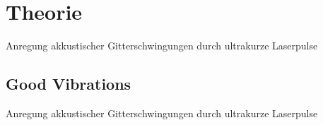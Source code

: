 \section{Theorie}

Anregung akkustischer Gitterschwingungen durch ultrakurze Laserpulse

\subsection{Good Vibrations}

Anregung akkustischer Gitterschwingungen durch ultrakurze Laserpulse
